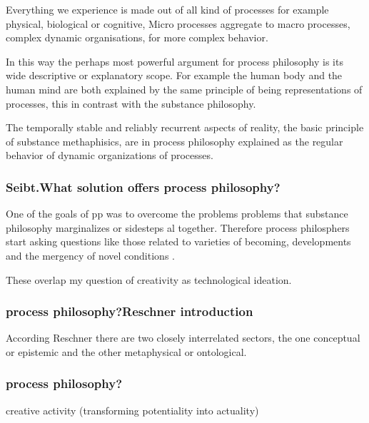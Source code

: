 Everything we experience is made out of all kind of processes for example physical, biological or cognitive, Micro processes aggregate to macro processes, complex dynamic organisations, for more complex behavior. 

In this way the perhaps most powerful argument for process philosophy is its wide descriptive or explanatory scope. For example the human body and the human mind are both explained by the same principle of being representations of processes, this in contrast with the substance philosophy.

The temporally stable and reliably recurrent aspects of reality, the basic principle of substance methaphisics, are in process philosophy explained as the regular behavior of dynamic organizations of processes.





\subsubsection{Seibt.What solution offers process philosophy?}
One of the goals of pp was to overcome the problems problems that substance philosophy marginalizes or sidesteps al together. Therefore process philosphers start asking questions like those related to varieties of becoming, developments and the mergency of novel conditions \cite{seibt-2013-sep}.

These overlap my question of creativity as technological ideation.























\subsubsection{process philosophy?Reschner introduction}
According Reschner  \cite{rescher1996process} there are two closely interrelated sectors, the one conceptual or epistemic
and the other metaphysical or ontological.


\subsubsection{process philosophy?}
creative activity (transforming potentiality into actuality)

